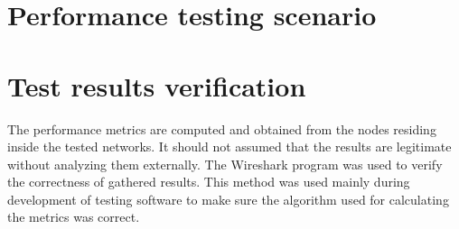\medskip
\section{Performance testing scenario}
\label{sec:performance-testing-scenario}

\medskip
\section{Test results verification}
\label{sec:test-results-verification}

The performance metrics are computed and obtained from the nodes residing inside 
the tested networks. It should not assumed that the results are legitimate without
analyzing them externally. The Wireshark program was used to verify the correctness
of gathered results. This method was used mainly during development of testing
software to make sure the algorithm used for calculating the metrics was correct.




